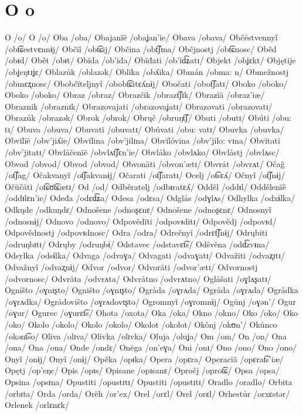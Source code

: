 \chapter{O o}

O /o/
O /o/
Oba /oba/
Obajanïë /obaʝan’ie/
Obava /obava/
Občëstvennyǐ /obt͡ɕestvɛnnɨj/
Občïǐ /obt͡ɕij/
Občina /obt͡ʃɪna/
Občjnostj /obt͡ɕnosc/
Oběd /obᵻd/
Obět /obᵻt/
Obïda /ob’ida/
Obïđati /ob’id͡ʑatɪ/
Objekt /obʝɛkt/
Objętije /obʝeŋtɪʝɛ/
Oblazůk /oblazək/
Oblïka /obʎika/
Obmán /obma: n/
Obmežnostj /obmɛʐnosc/
Obobčïteljnyǐ /obobt͡ɕitɛʎnɨj/
Obočati /obot͡ʃatɪ/
Oboko /oboko/
Oboko /oboko/
Obraz /obraz/
Obrazčik /obrazt͡ʃɪk/
Obrazïä /obraz’iæ/
Obraznik /obraznɪk/
Obrazovajati /obrazovaʝatɪ/
Obrazovati /obrazovatɪ/
Obrazůk /obrazək/
Obrok /obrok/
Obrųč /obruŋt͡ʃ/
Obuti /obutɪ/
Obúti /obu: tɪ/
Obuva /obuva/
Obuvati /obuvatɪ/
Obúvati /obu: vatɪ/
Obuvka /obuvka/
Obvĭlïë /obv’jiʎie/
Obvĭlina /obv’jilɪna/
Obvĭlóvina /obv’jilo: vɪna/
Obvĭtati /obv’jitatɪ/
Obvlåčenïë /obvlʌt͡ʃɛn’ie/
Obvlåko /obvlʌko/
Obvlåstj /obvlʌsc/
Obvod /obvod/
Obvod /obvod/
Obvonäti /obvon’ætɪ/
Obvråt /obvrʌt/
Očaĝ /ot͡ʃag/
Očakvanyǐ /ot͡ʃakvanɨj/
Očarati /ot͡ʃaratɪ/
Ocelj /ot͡sɛʎ/
Očnyǐ /ot͡ʃnɨj/
Očüčäti /ot͡ɕʊ̈t͡ɕætɪ/
Od /od/
Odběratelj /odbᵻratɛʎ/
Odděl /oddᵻl/
Oddělenïë /oddᵻlɛn’ie/
Odeđa /odɛd͡ʑa/
Odesa /odɛsa/
Odglås /odɣlʌs/
Odhylka /odxɨlka/
Odkųde /odkuŋdɛ/
Odnošene /odnoʂɛnɛ/
Odnošene /odnoʂɛnɛ/
Odnosnyǐ /odnosnɨj/
Odnovo /odnovo/
Odpovědïti /odpovᵻditɪ/
Odpovědj /odpovᵻd/
Odpovědnostj /odpovᵻdnosc/
Odra /odra/
Odrečnyǐ /odrɛt͡ʃnɨj/
Odrųbiti /odruŋbɪtɪ/
Odrųby /odruŋbɨ/
Odstavec /odstavɛt͡s/
Odŝvěna /odd͡zvᵻna/
Odsylka /odsɨlka/
Odvaga /odvaɣa/
Odvagati /odvaɣatɪ/
Odvažiti /odvaʐɪtɪ/
Odvažnyǐ /odvaʐnɨj/
Odvor /odvor/
Odvoräti /odvor’ætɪ/
Odvornostj /odvornosc/
Odvråta /odvrʌta/
Odvråtno /odvrʌtno/
Oglåšati /oɣlʌʂatɪ/
Ogništo /oɣnɪʂto/
Ogništo /oɣnɪʂto/
Ogråda /oɣrʌda/
Ogråda /oɣrʌda/
Ogrådka /oɣrʌdka/
Ogrådovišto /oɣrʌdovɪʂto/
Ogromnyǐ /oɣromnɨj/
Ogůnj /oɣən’/
Ogur /oɣur/
Ogurec /oɣurɛt͡s/
Ohota /oxota/
Oka /oka/
Okno /okno/
Oko /oko/
Oko /oko/
Okolo /okolo/
Okolo /okolo/
Okolot /okolot/
Okônj /okʊn’/
Okůnco /okənt͡so/
Oliva /olɪva/
Olivka /olɪvka/
Oluja /oluʝa/
Om /om/
On /on/
Ona /ona/
Ona /ona/
Onde /ondɛ/
Onëga /on’eɣa/
Oni /onɪ/
Ono /ono/
Ono /ono/
Onyǐ /onɨj/
Onyǐ /onɨj/
Opěka /opᵻka/
Opera /opɛra/
Operacïä /opɛrat͡s’iæ/
Opętj /op’eŋc/
Opis /opɪs/
Opisane /opɪsanɛ/
Opročj /oprot͡ɕ/
Opsa /opsa/
Opsina /opsɪna/
Opustiti /opustɪtɪ/
Opustiti /opustɪtɪ/
Oradlo /oradlo/
Orbita /orbɪta/
Orda /orda/
Orëh /or’ex/
Orel /orɛl/
Orel /orɛl/
Orhestůr /orxɛstər/
Orlenek /orlɛnɛk/
